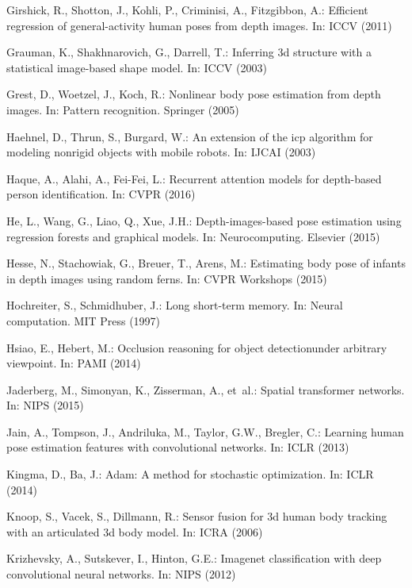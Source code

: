 \documentclass[runningheads]{llncs}
\begin{document}
\begin{thebibliography}{10}
	Girshick, R., Shotton, J., Kohli, P., Criminisi, A., Fitzgibbon, A.: Efficient
	regression of general-activity human poses from depth images. In: ICCV (2011)

	Grauman, K., Shakhnarovich, G., Darrell, T.: Inferring 3d structure with a
	statistical image-based shape model. In: ICCV (2003)

	Grest, D., Woetzel, J., Koch, R.: Nonlinear body pose estimation from depth
	images. In: Pattern recognition. Springer (2005)

	Haehnel, D., Thrun, S., Burgard, W.: An extension of the icp algorithm for
	modeling nonrigid objects with mobile robots. In: IJCAI (2003)

	Haque, A., Alahi, A., Fei-Fei, L.: Recurrent attention models for depth-based
	person identification. In: CVPR (2016)

	He, L., Wang, G., Liao, Q., Xue, J.H.: Depth-images-based pose estimation using
	regression forests and graphical models. In: Neurocomputing. Elsevier (2015)

	Hesse, N., Stachowiak, G., Breuer, T., Arens, M.: Estimating body pose of
	infants in depth images using random ferns. In: CVPR Workshops (2015)

	Hochreiter, S., Schmidhuber, J.: Long short-term memory. In: Neural
	computation. MIT Press (1997)

	Hsiao, E., Hebert, M.: Occlusion reasoning for object detectionunder arbitrary
	viewpoint. In: PAMI (2014)

	Jaderberg, M., Simonyan, K., Zisserman, A., et~al.: Spatial transformer
	networks. In: NIPS (2015)

	Jain, A., Tompson, J., Andriluka, M., Taylor, G.W., Bregler, C.: Learning human
	pose estimation features with convolutional networks. In: ICLR (2013)

	Kingma, D., Ba, J.: Adam: A method for stochastic optimization. In: ICLR (2014)

	Knoop, S., Vacek, S., Dillmann, R.: Sensor fusion for 3d human body tracking
	with an articulated 3d body model. In: ICRA (2006)

	Krizhevsky, A., Sutskever, I., Hinton, G.E.: Imagenet classification with deep
	convolutional neural networks. In: NIPS (2012)


\end{thebibliography}
\end{document}
